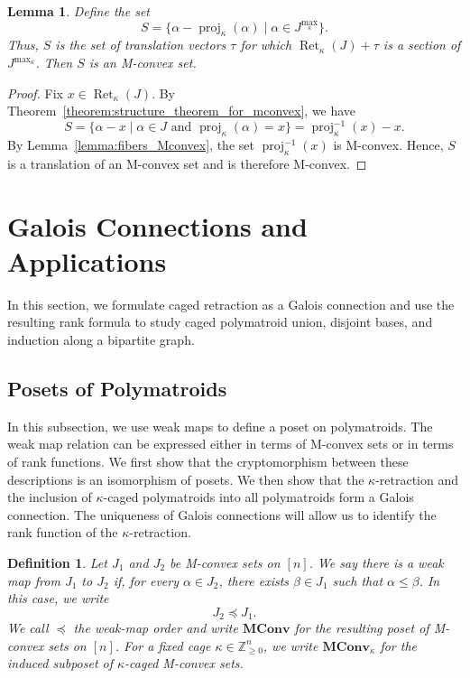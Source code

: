 \documentclass[10pt,a4paper]{amsart}
\newtheorem{lemma}[theorem]{Lemma}
\newtheorem{definition}[theorem]{Definition}
\newcommand{\Zgeqn}{\mathbb{Z}_{\geq 0}^n}     %
\newcommand{\MConv}{\mathbf{MConv}}    %
\newcommand{\MConvK}{\mathbf{MConv}_\kappa}
\DeclareMathOperator{\proj}{proj}              %
\newcommand{\kproj}{\proj_{\kappa}}            %
\DeclareMathOperator{\Ret}{Ret}                %
\newcommand{\RetK}{\Ret_{\kappa}}              %
\newcommand{\Jmax}{J^{\max_{\kappa}}}
\begin{document}
\begin{lemma} \label{lemma:collection_of_sections_is_M-convex}
    Define the set
    \[
    S = \{\alpha - \kproj(\alpha) \mid \alpha \in \Jmax\}.
    \]
    Thus, $S$ is the set of translation vectors $\tau$ for which $\RetK(J) + \tau$ is a section of $\Jmax$. Then $S$ is an M-convex set.
\end{lemma}
\begin{proof}
    Fix $x \in \RetK(J)$. By Theorem~\ref{theorem:structure_theorem_for_mconvex}, we have
    \[
    S = \{\alpha - x \mid \alpha \in J \text{ and } \kproj(\alpha) = x\}
    = \kproj^{-1}(x) - x.
    \]
    By Lemma~\ref{lemma:fibers_Mconvex}, the set $\kproj^{-1}(x)$ is M-convex. Hence, $S$ is a translation of an M-convex set and is therefore M-convex.
\end{proof}



\section{Galois Connections and Applications}
\label{section:galois_connections_and_applications}
In this section, we formulate caged retraction as a Galois connection and use the resulting rank formula to study caged polymatroid union, disjoint bases, and induction along a bipartite graph.
\subsection{Posets of Polymatroids}

In this subsection, we use weak maps to define a poset on polymatroids. The weak map relation can be expressed either in terms of M-convex sets
or in terms of rank functions. We first show that the cryptomorphism between
these descriptions is an isomorphism of posets. We then show that the
$\kappa$-retraction and the inclusion of $\kappa$-caged polymatroids into all
polymatroids form a Galois connection. The uniqueness of Galois connections
will allow us to identify the rank function of the $\kappa$-retraction.

\begin{definition}\label{def:weak_map_order_mconvex}
    Let $J_1$ and $J_2$ be M-convex sets on $[n]$. We say there is a
    \emph{weak map} from $J_1$ to $J_2$ if, for every $\alpha\in J_2$,
    there exists $\beta\in J_1$ such that $\alpha\leq\beta$. In this case,
    we write
    \[
        J_2\preceq J_1.
    \]
    We call $\preceq$ the \emph{weak-map order} and write $\MConv$ for the
    resulting poset of M-convex sets on $[n]$. For a fixed cage
    $\kappa\in\Zgeqn$, we write $\MConvK$ for the induced subposet of
    $\kappa$-caged M-convex sets.
\end{definition}
\end{document}
